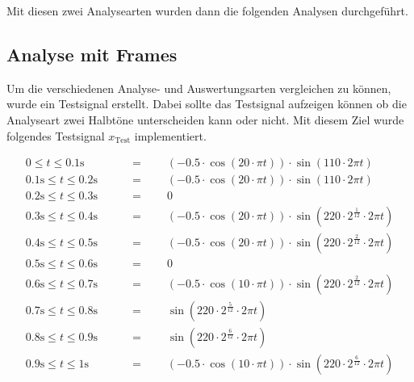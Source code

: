 Mit diesen zwei Analysearten wurden dann die folgenden Analysen durchgeführt.
\newpage

\subsection{Analyse mit Frames}

Um die verschiedenen Analyse- und Auswertungsarten vergleichen zu können, wurde ein Testsignal erstellt. Dabei sollte das Testsignal aufzeigen können ob die Analyseart zwei Halbtöne unterscheiden kann oder nicht. Mit diesem Ziel wurde folgendes Testsignal $x_{\text{Test}}$ implementiert.


	\begin{align*}
	0 \leq t \leq 0.1\text{s} \qquad			& = \qquad (-0.5\cdot \cos(20\cdot\pi t))\cdot \sin(110\cdot 2\pi t) \\
	0.1\text{s} \leq t \leq 0.2\text{s}\qquad	& = \qquad (-0.5\cdot \cos(20\cdot\pi t))\cdot \sin(110\cdot 2\pi t) \\
	0.2\text{s} \leq t \leq 0.3\text{s}\qquad	& = \qquad 0\\
	0.3\text{s} \leq t \leq 0.4\text{s}\qquad	& = \qquad (-0.5\cdot \cos(20\cdot\pi t))\cdot \sin(220\cdot  2^{\frac{1}{12}}\cdot 2\pi t) \\
	0.4\text{s} \leq t \leq 0.5\text{s}\qquad	& = \qquad (-0.5\cdot \cos(20\cdot\pi t))\cdot \sin(220\cdot2^{\frac{2}{12}}\cdot 2\pi t) \\
	0.5\text{s} \leq t \leq 0.6\text{s}\qquad	& = \qquad 0 \\
	0.6\text{s} \leq t \leq 0.7\text{s}\qquad	& = \qquad (-0.5\cdot \cos(10\cdot\pi t))\cdot \sin(220\cdot2^{\frac{2}{12}}\cdot 2\pi t) \\
	0.7\text{s} \leq t \leq 0.8\text{s}\qquad	& = \qquad \sin(220\cdot2^{\frac{5}{12}}\cdot 2\pi t) \\
	0.8\text{s} \leq t \leq 0.9\text{s}\qquad	& = \qquad \sin(220\cdot2^{\frac{6}{12}}\cdot 2\pi t) \\
	0.9\text{s} \leq t \leq 1\text{s}\qquad		& = \qquad (-0.5\cdot \cos(10\cdot\pi t))\cdot \sin(220\cdot2^{\frac{6}{12}}\cdot 2\pi t) \\
	\end{align*}

